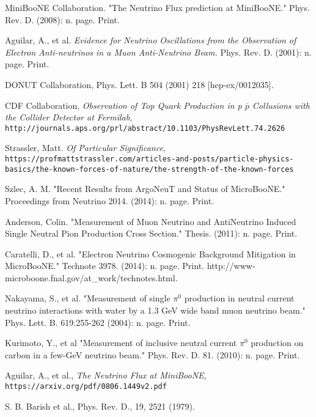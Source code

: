 \documentclass[12pt]{article}
\begin{document}
\begin{thebibliography}{20}
MiniBooNE Collaboration. "The Neutrino Flux prediction at MiniBooNE." Phys. Rev. D. (2008): n. page. Print.

Aguilar, A., et al. \emph{Evidence for Neutrino Oscillations from the Observation of Electron Anti-neutrinos in a Muon Anti-Neutrino Beam.} Phys. Rev. D. (2001): n. page. Print.

DONUT Collaboration, Phys. Lett. B 504 (2001) 218 [hep-ex/0012035].

CDF Collaboration, \emph{Observation of Top Quark Production in p $\overline{p}$ Collusions with the Collider Detector at Fermilab},\\
  \texttt{http://journals.aps.org/prl/abstract/10.1103/PhysRevLett.74.2626}

Strassler, Matt. \emph{Of Particular Significance},\\
  \texttt{https://profmattstrassler.com/articles-and-posts/particle-physics-basics/the-known-forces-of-nature/the-strength-of-the-known-forces}

Szlec, A. M. "Recent Results from ArgoNeuT and Status of MicroBooNE." Proceedings from Neutrino 2014. (2014): n. page. Print.

Anderson, Colin. "Measurement of Muon Neutrino and AntiNeutrino Induced Single Neutral Pion Production Cross Section." Thesis. (2011): n. page. Print.

Caratelli, D., et al. "Electron Neutrino Cosmogenic Background Mitigation in MicroBooNE." Technote 3978. (2014): n. page. Print. http://www-microboone.fnal.gov/at\_work/technotes.html.

Nakayama, S., et al. "Measurement of single $\pi^0$ production in neutral current neutrino interactions with water by a 1.3 GeV wide band muon neutrino beam." Phys. Lett. B. 619.255-262 (2004): n. page. Print.

Kurimoto, Y., et al "Measurement of inclusive neutral current $\pi^0$ production on carbon in a few-GeV neutrino beam." Phys. Rev. D. 81. (2010): n. page. Print.

  Aguilar, A., et al., \emph{The Neutrino Flux at MiniBooNE},\\
    \texttt{https://arxiv.org/pdf/0806.1449v2.pdf}

  S. B. Barish et al., Phys. Rev. D., 19, 2521 (1979).


\end{thebibliography}
\end{document}
